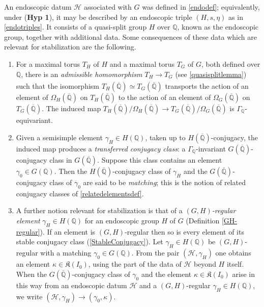 \documentclass[11pt,a4paper]{article}
\newcommand{\HypOne}{\textbf{Hyp 1}}
\theoremstyle{definition}
\theoremstyle{plain}
\theoremstyle{remark}
\theoremstyle{plain}
\begin{document}
An endoscopic datum $\mathcal{H}$ associated with $G$ was defined in \ref{endodef}; equivalently, under (\HypOne{}), it may be described by an endoscopic triple $(H,s,\eta)$ as in \ref{endotriples}. It consists of a quasi-split group $H$ over $\mathbb{Q}$, known as the endoscopic group, together with additional data. Some consequences of these data which are relevant for stabilization are the following.
\begin{enumerate}
    \item For a maximal torus $T_H$ of $H$ and a maximal torus $T_G$ of $G$, both defined over $\mathbb{Q}$, there is an \textit{admissible homomorphism} $T_H \xrightarrow[]{} T_G$ (see \ref{quasisplitlemma}) such that the isomorphism $T_H(\overline{\mathbb{Q}}) \simeq T_G(\overline{\mathbb{Q}})$ transports the action of an element of $\Omega_H(\overline{\mathbb{Q}})$ on $T_H(\overline{\mathbb{Q}})$ to the action of an element of $\Omega_G(\overline{\mathbb{Q}})$ on $T_G(\overline{\mathbb{Q}})$. The induced map $T_H(\overline{\mathbb{Q}}) / \Omega_H(\overline{\mathbb{Q}}) \xrightarrow[]{} T_G(\overline{\mathbb{Q}}) / \Omega_G(\overline{\mathbb{Q}})$ is $\Gamma_{\mathbb{Q}}$-equivariant.
    \item Given a semisimple element $\gamma_H \in H(\mathbb{Q})$, taken up to $H(\overline{\mathbb{Q}})$-conjugacy, the induced map produces a \textit{transferred conjugacy class}: a $\Gamma_{\mathbb{Q}}$-invariant $G(\overline{\mathbb{Q}})$-conjugacy class in $G(\overline{\mathbb{Q}})$. Suppose this class contains an element $\gamma_0 \in G(\mathbb{Q})$. Then the $H(\overline{\mathbb{Q}})$-conjugacy class of $\gamma_H$ and the $G(\overline{\mathbb{Q}})$-conjugacy class of $\gamma_0$ are said to be \textit{matching}; this is the notion of related conjugacy classes of \ref{relatedelementsdef}.
    \item A further notion relevant for stabilization is that of a \textit{$(G,H)$-regular element} $\gamma_H \in H(\mathbb{Q})$ for an endoscopic group $H$ of $G$ (Definition \ref{GH-regular}). If an element is $(G,H)$-regular then so is every element of its stable conjugacy class (\ref{StableConjugacy}). Let $\gamma_H \in H(\mathbb{Q})$ be $(G,H)$-regular with a matching $\gamma_0 \in G(\mathbb{Q})$. From the pair $(\mathcal{H}, \gamma_H)$ one obtains an element $\kappa \in \mathfrak{K}(I_0)$, using the part of the data of $\mathcal{H}$ beyond $H$ itself. When the $G(\overline{\mathbb{Q}})$-conjugacy class of $\gamma_0$ and the element $\kappa \in \mathfrak{K}(I_0)$ arise in this way from an endoscopic datum $\mathcal{H}$ and a $(G,H)$-regular $\gamma_H \in H(\mathbb{Q})$, we write $(\mathcal{H}, \gamma_H) \xrightarrow[]{} (\gamma_0, \kappa)$.
\end{enumerate}
\end{document}

